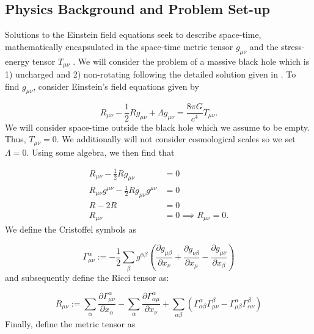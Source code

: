 \documentclass{CUP-JNL-DTM}%
\theoremstyle{definition}
\numberwithin{equation}{section}
\begin{document}
\subsection{Physics Background and Problem Set-up}

Solutions to the Einstein field equations seek to describe space-time, mathematically encapsulated in the space-time metric tensor $g_{\mu\nu}$ and the stress-energy tensor $T_{\mu\nu}$ . We will consider the problem of a massive black hole which is 1) uncharged and 2) non-rotating following the detailed solution given in \cite{eigenchrisRelativity108aSchwarzschild}. To find $g_{\mu\nu}$, consider Einstein's field equations given by 

\begin{equation}
    R_{\mu\nu} - \frac{1}{2}R g_{\mu\nu} + \Lambda g_{\mu\nu} = \frac{8 \pi G}{c^4}T_{\mu\nu}.
    \label{eqn:EFE}
\end{equation}
We will consider space-time outside the black hole which we assume to be empty. Thus, $T_{\mu\nu} = 0$. We additionally will not consider cosmological scales so we set $\Lambda = 0$. Using some algebra, we then find that

\begin{equation}
\begin{split}
    R_{\mu\nu} - \frac{1}{2}Rg_{\mu\nu} & = 0 \\
    R_{\mu\nu}g^{\mu\nu} - \frac{1}{2}Rg_{\mu\nu}g^{\mu\nu} & = 0 \\
    R - 2R & = 0 \\ 
    R_{\mu\nu} & = 0 \implies \boxed{R_{\mu\nu} = 0}. 
\end{split}
\end{equation}
We define the Cristoffel symbols as

\begin{equation}
    \Gamma^{\alpha}_{\mu\nu} := -\frac{1}{2}\sum_{\beta}g^{\alpha\beta}\left(\frac{\partial g_{\mu\beta}}{\partial x_{\nu}} + \frac{\partial g_{\nu\beta}}{\partial x_{\mu}} - \frac{\partial g_{\mu\nu}}{\partial x_{\beta}}\right)
    \label{eqn:ccs}
\end{equation}
and subsequently define the Ricci tensor as:

\begin{equation}
    R_{\mu\nu} := \sum_{\alpha} \frac{\partial \Gamma^{\alpha}_{\mu\nu}}{\partial x_{\alpha}} - \sum_{\alpha} \frac{\partial \Gamma^{\alpha}_{\alpha\mu}}{\partial x_{\nu}} + \sum_{\alpha\beta} \left(\Gamma^{\alpha}_{\alpha\beta} \Gamma^{\beta}_{\mu\nu} - \Gamma^{\alpha}_{\mu\beta} \Gamma^{\beta}_{\alpha\nu}\right)
    \label{eqn:ricci}
\end{equation}
Finally, define the metric tensor as 
\end{document}

